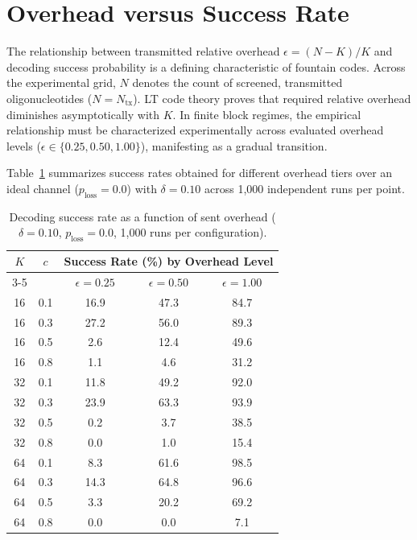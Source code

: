 \section{Overhead versus Success Rate}
\label{sec:results_overhead_success_rate}

The relationship between transmitted relative overhead $\epsilon = (N - K)/K$ and decoding success probability is a defining characteristic of fountain codes. Across the experimental grid, $N$ denotes the count of screened, transmitted oligonucleotides ($N = N_{\text{tx}}$). LT code theory proves that required relative overhead diminishes asymptotically with $K$. In finite block regimes, the empirical relationship must be characterized experimentally across evaluated overhead levels ($\epsilon \in \{0.25, 0.50, 1.00\}$), manifesting as a gradual transition.

Table~\ref{tab:overhead_sucesso} summarizes success rates obtained for different overhead tiers over an ideal channel ($p_{\text{loss}} = 0.0$) with $\delta = 0.10$ across 1,000 independent runs per point.

\begin{table}[htbp]
    \centering
    \small
    \caption{Decoding success rate as a function of sent overhead ($\delta = 0.10$, $p_{\text{loss}} = 0.0$, 1,000 runs per configuration).}
    \label{tab:overhead_sucesso}
    \begin{tabular}{ccccc}
        \toprule
        \multirow{2}{*}{\textbf{$K$}} & \multirow{2}{*}{\textbf{$c$}} & \multicolumn{3}{c}{\textbf{Success Rate (\%) by Overhead Level}} \\
        \cmidrule(lr){3-5}
        & & \textbf{$\epsilon = 0.25$} & \textbf{$\epsilon = 0.50$} & \textbf{$\epsilon = 1.00$} \\
        \midrule
        16 & 0.1 & 16.9 & 47.3 & 84.7 \\
        16 & 0.3 & 27.2 & 56.0 & 89.3 \\
        16 & 0.5 & 2.6 & 12.4 & 49.6 \\
        16 & 0.8 & 1.1 & 4.6 & 31.2 \\
        \midrule
        32 & 0.1 & 11.8 & 49.2 & 92.0 \\
        32 & 0.3 & 23.9 & 63.3 & 93.9 \\
        32 & 0.5 & 0.2 & 3.7 & 38.5 \\
        32 & 0.8 & 0.0 & 1.0 & 15.4 \\
        \midrule
        64 & 0.1 & 8.3 & 61.6 & 98.5 \\
        64 & 0.3 & 14.3 & 64.8 & 96.6 \\
        64 & 0.5 & 3.3 & 20.2 & 69.2 \\
        64 & 0.8 & 0.0 & 0.0 & 7.1 \\
        \bottomrule
    \end{tabular}
\end{table}

